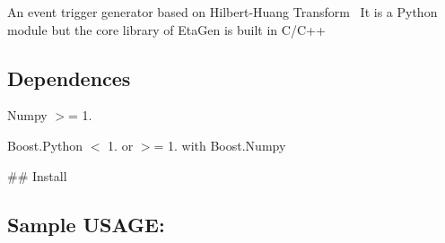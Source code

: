 An event trigger generator based on Hilbert-\/\+Huang Transform~\newline
 It is a Python module but the core library of Eta\+Gen is built in C/\+C++

\subsection*{Dependences}


\begin{DoxyItemize}
\item Numpy $>$= 1.
\item Boost.\+Python $<$ 1. or $>$= 1. with Boost.\+Numpy
\end{DoxyItemize}

\#\# Install 


\subsection*{Sample U\+S\+A\+GE\+:}


